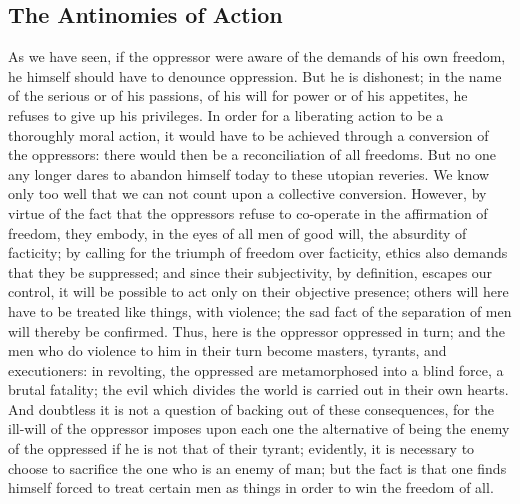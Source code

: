 \documentclass[11pt]{article}
\begin{document}
{{\subsection{The Antinomies of Action}
As we have seen, if the oppressor were aware of the demands of his own freedom, he himself should have to denounce oppression. But he is dishonest; in the name of the serious or of his passions, of his will for power or of his appetites, he refuses to give up his privileges. In order for a liberating action to be a thoroughly moral action, it would have to be achieved through a conversion of the oppressors: there would then be a reconciliation of all freedoms. But no one any longer dares to abandon himself today to these utopian reveries. We know only too well that we can not count upon a collective conversion. However, by virtue of the fact that the oppressors refuse to co-operate in the affirmation of freedom, they embody, in the eyes of all men of good will, the absurdity of facticity; by calling for the triumph of freedom over facticity, ethics also demands that they be suppressed; and since their subjectivity, by definition, escapes our control, it will be possible to act only on their objective presence; others will here have to be treated like things, with violence; the sad fact of the separation of men will thereby be confirmed. Thus, here is the oppressor oppressed in turn; and the men who do violence to him in their turn become masters, tyrants, and executioners: in revolting, the oppressed are metamorphosed into a blind force, a brutal fatality; the evil which divides the world is carried out in their own hearts. And doubtless it is not a question of backing out of these consequences, for the ill-will of the oppressor imposes upon each one the alternative of being the enemy of the oppressed if he is not that of their tyrant; evidently, it is necessary to choose to sacrifice the one who is an enemy of man; but the fact is that one finds himself forced to treat certain men as things in order to win the freedom of all.

}}
\end{document}
